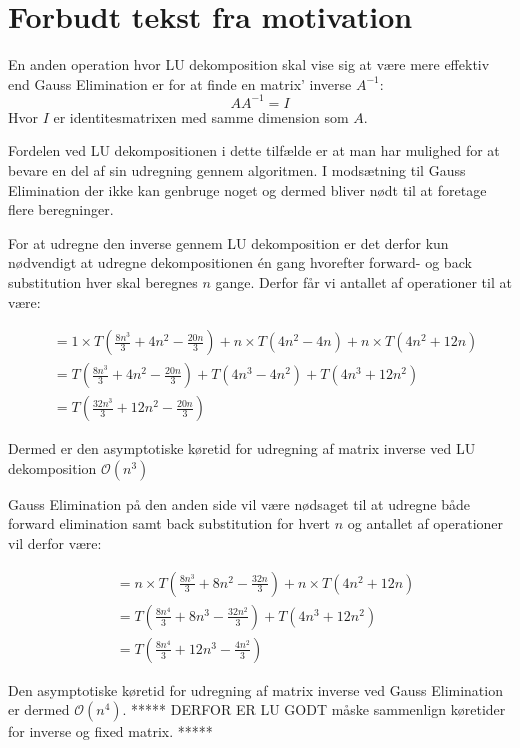 \documentclass{article}
\begin{document}
\pagebreak
\section{Forbudt tekst fra motivation}
En anden operation hvor LU dekomposition skal vise sig at være mere effektiv end Gauss Elimination er for at finde en matrix' inverse $A^{-1}$: 
$$
AA^{-1} = I
$$
Hvor $I$ er identitesmatrixen med samme dimension som $A$.\vspace{\baselineskip}

Fordelen ved LU dekompositionen i dette tilfælde er at man har mulighed for at bevare en del af sin udregning gennem algoritmen. I modsætning til Gauss Elimination der ikke kan genbruge noget og dermed bliver nødt til at foretage flere beregninger.\vspace{\baselineskip}

For at udregne den inverse gennem LU dekomposition er det derfor kun nødvendigt at udregne dekompositionen én gang hvorefter forward- og back substitution hver skal beregnes $n$ gange. Derfor får vi antallet af operationer til at være:

\begin{align*}
&= 1 \times T\left(\frac{8n^3}{3} + 4n^2 - \frac{20n}{3}\right) + n \times T(4n^2 - 4n) + n \times T(4n^2 + 12n)\\
&= T\left(\frac{8n^3}{3} + 4n^2 - \frac{20n}{3}\right) + T(4n^3 - 4n^2) + T(4n^3 + 12n^2)\\
&= T\left(\frac{32n^3}{3} + 12n^2 - \frac{20n}{3}\right)
\end{align*}

Dermed er den asymptotiske køretid for udregning af matrix inverse ved LU dekomposition $\mathcal{O}(n^3)$\vspace{\baselineskip}

Gauss Elimination på den anden side vil være nødsaget til at udregne både forward elimination samt back substitution for hvert $n$ og antallet af operationer vil derfor være:

\begin{align*}
&= n \times T\left(\frac{8n^3}{3} + 8n^2 - \frac{32n}{3}\right) + n \times T(4n^2 + 12n)\\
&= T\left(\frac{8n^4}{3} + 8n^3 - \frac{32n^2}{3}\right) + T(4n^3 + 12n^2)\\
&= T\left(\frac{8n^4}{3} + 12n^3 - \frac{4n^2}{3}\right)
\end{align*}

Den asymptotiske køretid for udregning af matrix inverse ved Gauss Elimination er dermed $\mathcal{O}(n^4)$.\vspace{\baselineskip}
\newline\newline
***** DERFOR ER LU GODT måske sammenlign køretider for inverse og fixed matrix.
*****
\newline\newline
\end{document}
